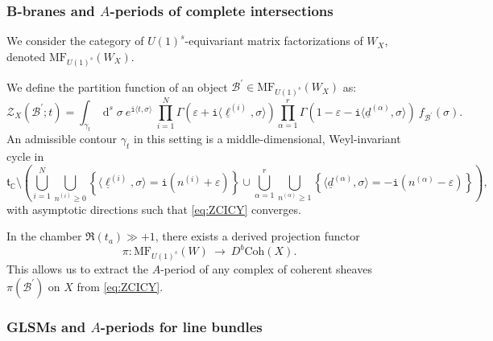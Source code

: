 \documentclass[12pt,a4paper,oneside]{amsart}
\numberwithin{equation}{section}
\theoremstyle{definition}
\theoremstyle{remark}
\DeclareMathOperator{\C}{\mathbb{C}}
\DeclareMathOperator{\dd}{d}
\newcommand{\mz}{\mathcal{Z}}
\newcommand{\Br}{\mathcal{B}}
\newcommand{\MF}{\mathrm{MF}}
\newcommand{\ii}{\mathtt{i}}
\begin{document}
\begin{appendix}
\subsubsection{B-branes and \texorpdfstring{$A$}{A}-periods of complete intersections}
We consider the category of $U(1)^s$-equivariant matrix factorizations of $W_X$, denoted $ \MF_{U(1)^s} (W_X)$.\par
We define the partition function of an object $\Br^{\prime} \in \MF_{U(1)^s} (W_X)$ as:
\begin{equation}
\label{eq:ZCICY}
	\mz_{X} \left( \Br^{\prime} ; t \right) = \int_{\gamma_t} \dd^s \sigma~e^{\ii \langle t, \sigma\rangle} ~\prod_{i=1}^{N} \Gamma \left( \varepsilon + \ii \langle \underline{\ell}^{(i)}, \sigma \rangle \right) \prod_{\alpha=1}^{r} \Gamma \left( 1 - \varepsilon - \ii \langle\underline{d}^{(\alpha)}, \sigma \rangle \right) ~f_{\Br^{\prime}} (\sigma) .
\end{equation}
An admissible contour $\gamma_t$ in this setting is a middle-dimensional, Weyl-invariant cycle in 
\begin{equation*}
	\mathfrak{t}_{\C} \setminus \left( \bigcup_{i=1}^{N} \bigcup_{n^{(i)} \ge 0} \left\{ \langle \underline{\ell}^{(i)}, \sigma \rangle =\ii \left( n^{(i)} +\varepsilon\right) \right\}\cup \bigcup_{\alpha=1}^{r} \bigcup_{n^{(\alpha)} \ge 1} \left\{ \langle \underline{d}^{(\alpha)}, \sigma \rangle = -\ii \left( n^{(\alpha)} -\varepsilon\right) \right\} \right) ,
\end{equation*}
with asymptotic directions such that \eqref{eq:ZCICY} converges.\par
In the chamber $\Re (t_a) \gg +1$, there exists a derived projection functor \cite{Herbst:2008jq,Ballard:2016ncw,HalpernLeistner:2014}
\begin{equation*}
	\pi : \MF_{U(1)^s} (W) \ \longrightarrow \ D^{b} \mathrm{Coh} (X).
\end{equation*}
This allows us to extract the $A$-period of any complex of coherent sheaves $\pi (\Br^{\prime})$ on $X$ from \eqref{eq:ZCICY}.




\subsubsection{GLSMs and \texorpdfstring{$A$}{A}-periods for line bundles}
\label{app:AperiodVGLSM}


\end{appendix}
\end{document}
